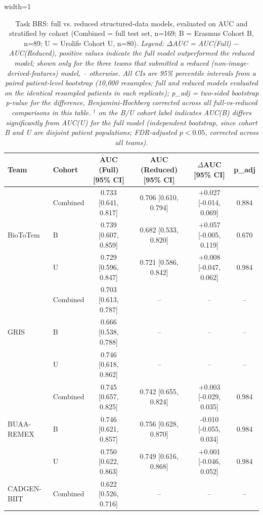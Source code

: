 \begin{table}[H]
  \centering
  \caption{Task BRS: full vs. reduced structured-data models, evaluated on AUC and stratified by cohort (Combined = full test set, n=169; B = Erasmus Cohort B, n=89; U = Urolife Cohort U, n=80). \textit{Legend: $\Delta$AUC = AUC(Full) $-$ AUC(Reduced), positive values indicate the full model outperformed the reduced model; shown only for the three teams that submitted a reduced (non-image-derived-features) model, -- otherwise. All CIs are 95\% percentile intervals from a paired patient-level bootstrap (10,000 resamples; full and reduced models evaluated on the identical resampled patients in each replicate); p\_adj = two-sided bootstrap p-value for the difference, Benjamini-Hochberg corrected across all full-vs-reduced comparisons in this table. $^{\dagger}$ on the B/U cohort label indicates AUC(B) differs significantly from AUC(U) for the full model (independent bootstrap, since cohort B and U are disjoint patient populations; FDR-adjusted $p<0.05$, corrected across all teams).}}
  \begin{adjustbox}{width=1\textwidth}
  \begin{tabular}{llcccc}
  \textbf{Team} & \textbf{Cohort} & \textbf{AUC (Full) [95\% CI]} & \textbf{AUC (Reduced) [95\% CI]} & \textbf{$\Delta$AUC [95\% CI]} & \textbf{p\_adj} \\
  \hline
  \multirow{3}{*}{BioToTem} & Combined & 0.733 [0.641, 0.817] & 0.706 [0.610, 0.794] & +0.027 [-0.014, 0.069] & 0.884 \\
   & B & 0.739 [0.607, 0.859] & 0.682 [0.533, 0.820] & +0.057 [-0.005, 0.119] & 0.670 \\
   & U & 0.729 [0.596, 0.847] & 0.721 [0.586, 0.842] & +0.008 [-0.047, 0.062] & 0.984 \\
  \hline
  \multirow{3}{*}{GRIS} & Combined & 0.703 [0.613, 0.787] & -- & -- & -- \\
   & B & 0.666 [0.538, 0.788] & -- & -- & -- \\
   & U & 0.746 [0.618, 0.862] & -- & -- & -- \\
  \hline
  \multirow{3}{*}{BUAA-REMEX} & Combined & 0.745 [0.657, 0.825] & 0.742 [0.655, 0.824] & +0.003 [-0.029, 0.035] & 0.984 \\
   & B & 0.746 [0.621, 0.857] & 0.756 [0.628, 0.870] & -0.010 [-0.055, 0.034] & 0.984 \\
   & U & 0.750 [0.622, 0.863] & 0.749 [0.616, 0.868] & +0.001 [-0.046, 0.052] & 0.984 \\
  \hline
  \multirow{3}{*}{CADGEN-BIIT} & Combined & 0.622 [0.526, 0.716] & -- & -- & -- \\

\end{tabular}
\end{adjustbox}
\end{table}
